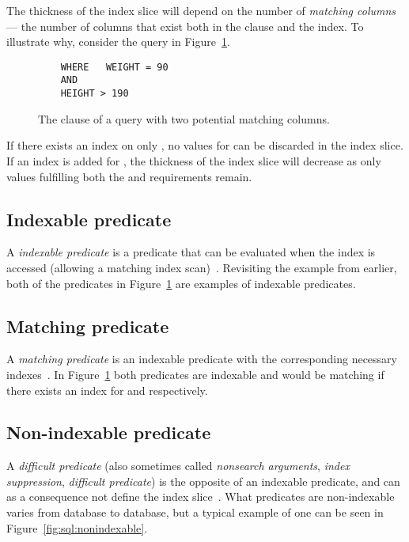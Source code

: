 The thickness of the index slice will depend on the number of \textit{matching
  columns} --- the number of columns that exist both in the 
clause and the index. To illustrate why, consider the query in
Figure~\ref{fig:sql:indexslice}.

\begin{figure}[ht]
  \begin{verbatim}
    WHERE   WEIGHT = 90
    AND
    HEIGHT > 190
  \end{verbatim}
  \caption[The  clause of a query with two potential matching
  columns]{The  clause of a query with two potential matching
    columns.}\label{fig:sql:indexslice}
\end{figure}

If there exists an index on only , no values for  can be
discarded in the index slice. If an index is added for , the
thickness of the index slice will decrease as only values fulfilling both the
 and  requirements remain.

\subsection*{Indexable predicate}
A \textit{indexable predicate} is a predicate that can be evaluated when the
index is accessed (allowing a matching index scan)~\cite{2014_summary_sopp,
  2013_ibm_ikcianp}. Revisiting the example from earlier, both of the predicates
in Figure~\ref{fig:sql:indexslice} are examples of indexable predicates.

\subsection*{Matching predicate}
A \textit{matching predicate} is an indexable predicate with the corresponding
necessary indexes~\cite{2013_ibm_ikcianp}. In Figure~\ref{fig:sql:indexslice}
both predicates are indexable and would be matching if there exists an index for
 and  respectively.

\subsection*{Non-indexable predicate}
A \textit{difficult predicate} (also sometimes called \textit{nonsearch
  arguments}, \textit{index suppression}, \textit{difficult predicate}) is the
opposite of an indexable predicate, and can as a consequence not define the
index slice~\cite{lahdenmaki_2005_relational_rdidatodossea}. What predicates are
non-indexable varies from database to database, but a typical example of one can
be seen in Figure~\ref{fig:sql:nonindexable}.

